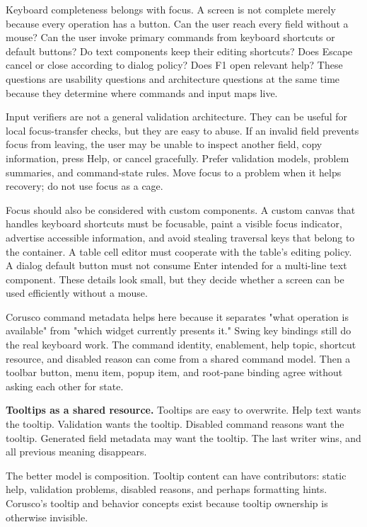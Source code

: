 Keyboard completeness belongs with focus. A screen is not complete merely
because every operation has a button. Can the user reach every field without a
mouse? Can the user invoke primary commands from keyboard shortcuts or default
buttons? Do text components keep their editing shortcuts? Does Escape cancel or
close according to dialog policy? Does F1 open relevant help? These questions
are usability questions and architecture questions at the same time because
they determine where commands and input maps live.

Input verifiers are not a general validation architecture. They can be useful
for local focus-transfer checks, but they are easy to abuse. If an invalid field
prevents focus from leaving, the user may be unable to inspect another field,
copy information, press Help, or cancel gracefully. Prefer validation models,
problem summaries, and command-state rules. Move focus to a problem when it
helps recovery; do not use focus as a cage.

Focus should also be considered with custom components. A custom canvas that
handles keyboard shortcuts must be focusable, paint a visible focus indicator,
advertise accessible information, and avoid stealing traversal keys that belong
to the container. A table cell editor must cooperate with the table's editing
policy. A dialog default button must not consume Enter intended for a
multi-line text component. These details look small, but they decide whether a
screen can be used efficiently without a mouse.

Corusco command metadata helps here because it separates "what operation is
available" from "which widget currently presents it." Swing key bindings still
do the real keyboard work. The command identity, enablement, help topic,
shortcut resource, and disabled reason can come from a shared command model.
Then a toolbar button, menu item, popup item, and root-pane binding agree
without asking each other for state.

\textbf{Tooltips as a shared resource.}
Tooltips are easy to overwrite. Help text wants the tooltip. Validation wants the tooltip. Disabled command reasons want the tooltip. Generated field metadata may want the tooltip. The last writer wins, and all previous meaning disappears.

The better model is composition. Tooltip content can have contributors: static help, validation problems, disabled reasons, and perhaps formatting hints. Corusco's tooltip and behavior concepts exist because tooltip ownership is otherwise invisible.

